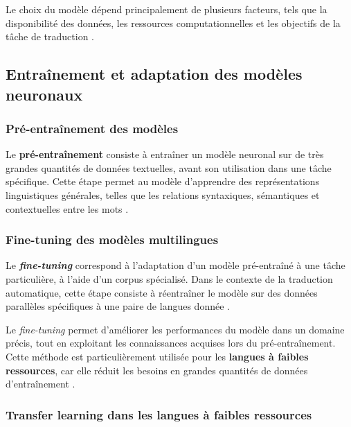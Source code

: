 Le choix du modèle dépend principalement de plusieurs facteurs, tels que la disponibilité des données, les ressources computationnelles et les objectifs de la tâche de traduction \cite{ranathunga2023neural}.

\subsection{Entraînement et adaptation des modèles neuronaux}

\subsubsection{Pré-entraînement des modèles}

Le \textbf{pré-entraînement} consiste à entraîner un modèle neuronal sur de très grandes quantités de données textuelles, avant son utilisation dans une tâche spécifique. Cette étape permet au modèle d'apprendre des représentations linguistiques générales, telles que les relations syntaxiques, sémantiques et contextuelles entre les mots \cite{Goodfellow-et-al-2016, ranathunga2023neural}.

\subsubsection{Fine-tuning des modèles multilingues}

Le \textbf{\textit{fine-tuning}} correspond à l'adaptation d'un modèle pré-entraîné à une tâche particulière, à l'aide d'un corpus spécialisé. Dans le contexte de la traduction automatique, cette étape consiste à réentraîner le modèle sur des données parallèles spécifiques à une paire de langues donnée \cite{kozhirbayev2024enhancing}.

Le \textit{fine-tuning} permet d'améliorer les performances du modèle dans un domaine précis, tout en exploitant les connaissances acquises lors du pré-entraînement. Cette méthode est particulièrement utilisée pour les \textbf{langues à faibles ressources}, car elle réduit les besoins en grandes quantités de données d'entraînement \cite{ma2025dongba}.

\subsubsection{Transfer learning dans les langues à faibles ressources}

